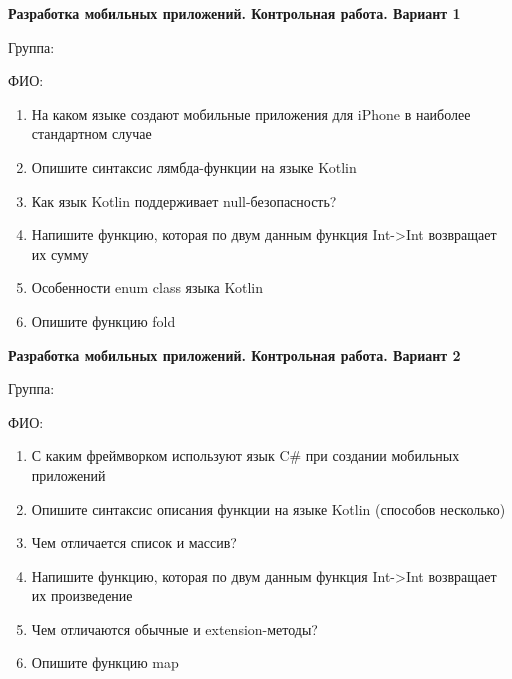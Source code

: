 \documentclass[12pt]{article}
\begin{document}
\begin{minipage}{\textwidth}
\textbf{Разработка мобильных приложений. Контрольная работа. Вариант 1}

Группа: \underline{\hspace{3cm}}

ФИО: \underline{\hspace{10cm}}

\begin{enumerate}
\item На каком языке создают мобильные приложения для iPhone в наиболее стандартном случае
\item Опишите синтаксис лямбда-функции на языке Kotlin
\item Как язык Kotlin поддерживает null-безопасность?
\item Напишите функцию, которая по двум данным функция Int->Int возвращает их сумму
\item Особенности enum class языка Kotlin
\item Опишите функцию fold

\end{enumerate}
\end{minipage}

\newpage\begin{minipage}{\textwidth}
\textbf{Разработка мобильных приложений. Контрольная работа. Вариант 2}

Группа: \underline{\hspace{3cm}}

ФИО: \underline{\hspace{10cm}}

\begin{enumerate}
\item С каким фреймворком используют язык C\# при создании мобильных приложений
\item Опишите синтаксис описания функции на языке Kotlin (способов несколько)
\item Чем отличается список и массив?
\item Напишите функцию, которая по двум данным функция Int->Int возвращает их произведение
\item Чем отличаются обычные и extension-методы?
\item Опишите функцию map

\end{enumerate}
\end{minipage}
\end{document}
